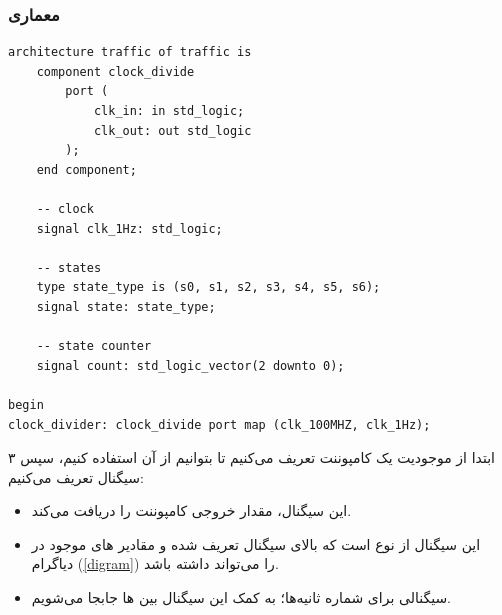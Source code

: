 \documentclass[dvipsnames, svgnames, x11names, a4paper, 11pt]{article}
\begin{document}
\subsubsection{معماری}
\begin{latin}
\begin{lstlisting}[firstnumber=12]
architecture traffic of traffic is
    component clock_divide
        port (
            clk_in: in std_logic;
            clk_out: out std_logic
        );
	end component;

    -- clock
    signal clk_1Hz: std_logic;

    -- states
    type state_type is (s0, s1, s2, s3, s4, s5, s6);
    signal state: state_type;

    -- state counter
    signal count: std_logic_vector(2 downto 0);

begin
clock_divider: clock_divide port map (clk_100MHZ, clk_1Hz);
\end{lstlisting}
\end{latin}
ابتدا
از موجودیت 
یک کامپوننت تعریف می‌کنیم تا بتوانیم از آن استفاده کنیم، سپس ۳ سیگنال تعریف می‌کنیم:
\begin{itemize}
\item {}

این سیگنال، مقدار خروجی کامپوننت 
را دریافت می‌کند.

\item {}

این سیگنال از نوع 
است که بالای سیگنال تعریف شده و مقادیر 
های
موجود در دیاگرام (\ref{digram}) را می‌تواند داشته باشد.

\item {}

سیگنالی برای شماره ثانیه‌ها؛ به کمک این سیگنال بین 
ها
جابجا می‌شویم.
\end{itemize}

\newpage
\end{document}
